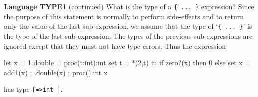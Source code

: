 \begin{minipage}[t]{\sw}
\slidenumber
\LARGE
{\bf Language TYPE1} (continued)\exx
What is the type of a \verb'{ ... }' expression?
Since the purpose of this statement is normally
to perform side-effects and
to return only the value of the last sub-expression,
we assume that the type of `\verb'{ ... }''
is the type of the last sub-expression.
The types of the previous sub-expressions are ignored
except that they
must not have type errors.\exx
Thus the expression
\Large
\begin{qv}
let
  x = 1
  double = proc(t:int):int set t = *(2,t)
in
  { if zero?(x) then 0 else set x = add1(x)
  ; .double(x)
  ; proc():int x
  }
\end{qv}
\LARGE
has type \verb'[=>int ]'.
\end{minipage}
